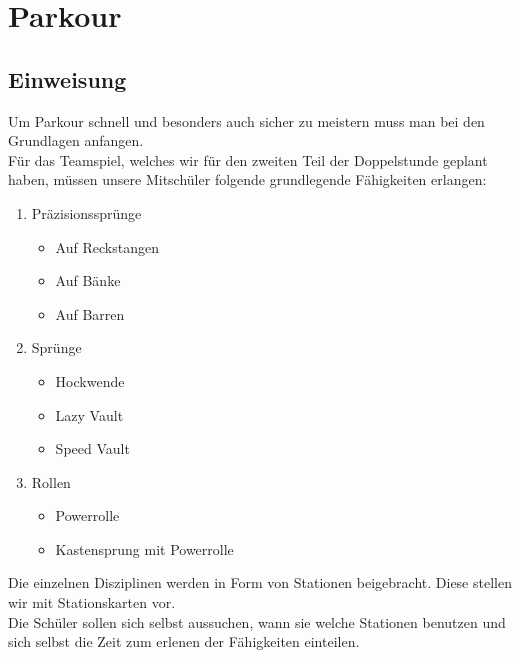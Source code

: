 \documentclass[ngerman,12pt,titlepage]{scrartcl}
\begin{document}
\section{Parkour}
\subsection{Einweisung}
Um Parkour schnell und besonders auch sicher zu meistern muss man bei den Grundlagen anfangen. \\ Für das Teamspiel, welches wir für den zweiten Teil der Doppelstunde geplant haben, müssen unsere Mitschüler folgende grundlegende Fähigkeiten erlangen:
\newpage
\begin{enumerate}
	\item Präzisionssprünge
	\begin{itemize}
		\item Auf Reckstangen
		\item Auf Bänke
		\item Auf Barren
	\end{itemize}
	\item Sprünge
	\begin{itemize}
		\item Hockwende
		\item Lazy Vault
		\item Speed Vault
	\end{itemize}
\item Rollen
\begin{itemize}
\item Powerrolle
\item Kastensprung mit Powerrolle
\end{itemize}
\end{enumerate}
Die einzelnen Disziplinen werden in Form von Stationen beigebracht. Diese stellen wir mit Stationskarten vor. \\ Die Schüler sollen sich selbst aussuchen, wann sie welche Stationen benutzen und sich selbst die Zeit zum erlenen der Fähigkeiten einteilen. 
\end{document}
